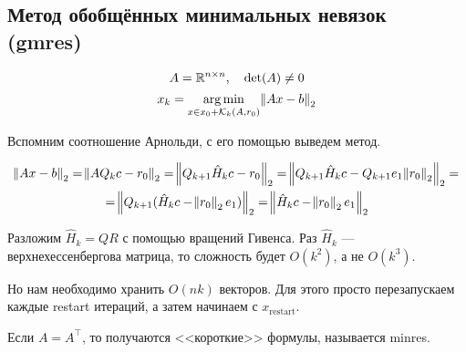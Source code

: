 \subsection{Метод обобщённых минимальных невязок (gmres)}

\[
    A = \mathbb{R}^{n \times n}, \quad \det(A) \ne 0
\]
\[
    x_k = \operatorname*{\arg \min}_{x \in x_0 + \mathcal{K}_k(A, r_0)} \norm{A x - b}_2
\]

Вспомним соотношение Арнольди, с его помощью выведем метод.

\begin{multline*}
    \norm{A x - b}_2 = \norm{A Q_k c - r_0}_2
    = \norm{Q_{k + 1} \hat{H}_k c - r_0}_2
    = \norm{Q_{k + 1} \hat{H}_k c - Q_{k + 1} e_1 \norm{r_0}_2}_2
    =\\= \norm{Q_{k + 1} (\hat{H}_k c - \norm{r_0}_2 e_1)}_2
    = \norm{\hat{H}_k c - \norm{r_0}_2 e_1}_2
\end{multline*}

Разложим $\hat{H}_k = Q R$ с помощью вращений Гивенса. Раз $\hat{H}_k$ ---
верхнехессенбергова матрица, то сложность будет $O(k^2)$, а не $O(k^3)$.

Но нам необходимо хранить $O(n k)$ векторов. Для этого просто перезапускаем
каждые restart итераций, а затем начинаем с $x_{\textrm{restart}}$.

Если $A = A^\top$, то получаются <<короткие>> формулы, называется minres.
